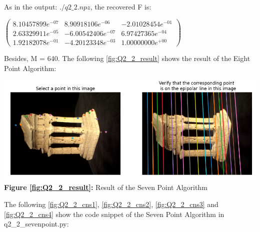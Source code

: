 \begin{your_solution}[title=Q2.2,height=23cm,width=\linewidth]
As in the output: $./q2\_2.npz$, the recovered F is: 
\newline

$\begin{pmatrix}
8.10457899e^{-07} &  8.90918106e^{-06} & -2.01028454e^{-01} \\
2.63329911e^{-05} & -6.00542406e^{-07} &  6.97427365e^{-04} \\
1.92182078e^{-01} & -4.20123348e^{-03} &  1.00000000e^{+00}
\end{pmatrix}$
\newline

Besides, M = 640.
\newline
The following \autoref{fig:Q2_2_result} shows the result of the Eight Point Algorithm:
\newline
\begin{minipage}{1\linewidth}
	\centering
	\includegraphics[width=\linewidth]{../Q2_2_result.png}
	\textbf{Figure \ref{fig:Q2_2_result}:} Result of the Seven Point Algorithm  %
	\label{fig:Q2_2_result}         %
\end{minipage}
\newline

The following \autoref{fig:Q2_2_cns1}, \autoref{fig:Q2_2_cns2}, \autoref{fig:Q2_2_cns3} and \autoref{fig:Q2_2_cns4} show the code snippet of the Seven Point Algorithm in q2\_2\_sevenpoint.py:
\newline



\end{your_solution}

